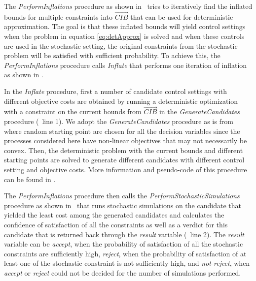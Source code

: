 \documentclass[a4paper, 12pt]{article} %
\begin{document}
The \textit{PerformInflations} procedure as shown in \algoPerfInfl~tries to iteratively find the inflated bounds for multiple constraints into $\overrightarrow{CIB}$ that can be used for deterministic approximation. The goal is that these inflated bounds will yield control settings when the problem in equation \ref{eq:detApprox} is solved and when these controls are used in the stochastic setting, the original constraints from the stochastic problem will be satisfied with sufficient probability.  
To achieve this, the \textit{PerformInflations} procedure calls \textit{Inflate} that performs one iteration of inflation as shown in \algoInflate. 

In the \textit{Inflate} procedure, first a number of candidate control settings with different objective costs are obtained by running a deterministic optimization with a constraint on the current bounds from $\overrightarrow{CIB}$ in the \textit{GenerateCandidates} procedure (\algoInflate~line 1). 
We adopt the \textit{GenerateCandidates} procedure as is from \cite{GMU-CS-TR-2017-3} where random starting point are chosen for all the decision variables since the processes considered here have non-linear objectives that may not necessarily be convex. Then, the deterministic problem with the current bounds and different starting points are solved to generate different candidates with different control setting and objective costs. More information and pseudo-code of this procedure can be found in \cite{GMU-CS-TR-2017-3}.


The \textit{PerformInflations} procedure then calls the \textit{PerformStochasticSimulations} procedure as shown in \algoStochSim~that runs stochastic simulations on the candidate that yielded the least cost among the generated candidates and calculates the confidence of satisfaction of all the constraints as well as a verdict for this candidate that is returned back through the \textit{result} variable (\algoInflate~line 2). The \textit{result} variable can be \textit{accept}, when the probability of satisfaction of all the stochastic constraints are sufficiently high, \textit{reject}, when the probability of satisfaction of at least one of the stochastic constraint is not sufficiently high, and \textit{not-reject}, when \textit{accept} or \textit{reject} could not be decided for the number of simulations performed.
\end{document}
